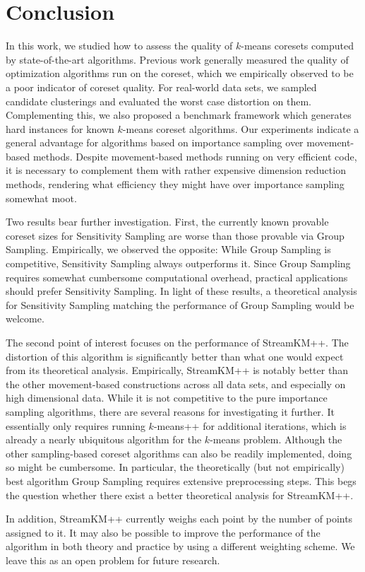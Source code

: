 \section{Conclusion} \label{sec:conclusion}
In this work, we studied how to assess the quality of $k$-means coresets computed by state-of-the-art algorithms. 
Previous work generally measured the quality of optimization algorithms run on the coreset, which we empirically observed to be a poor indicator of coreset quality.
For real-world data sets, we sampled candidate clusterings and evaluated the worst case distortion on them. Complementing this, we also proposed a benchmark framework which generates hard instances for known $k$-means coreset algorithms. Our experiments indicate a general advantage for algorithms based on importance sampling over movement-based methods. Despite movement-based methods running on very efficient code, it is necessary to complement them with rather expensive dimension reduction methods, rendering what efficiency they might have over importance sampling somewhat moot.

Two results bear further investigation. First, the currently known provable coreset sizes for Sensitivity Sampling are worse than those provable via Group Sampling. Empirically, we observed the opposite: While Group Sampling is competitive, Sensitivity Sampling always outperforms it. Since Group Sampling requires somewhat cumbersome computational overhead, practical applications should prefer Sensitivity Sampling. In light of these results, a theoretical analysis for Sensitivity Sampling matching the performance of Group Sampling would be welcome.

The second point of interest focuses on the performance of StreamKM++. The distortion of this algorithm is significantly better than what one would expect from its theoretical analysis.
Empirically, StreamKM++ is notably better than the other movement-based constructions across all data sets, and especially on high dimensional data.
While it is not competitive to the pure importance sampling algorithms, there are several reasons for investigating it further. It essentially only requires running $k$-means++ for additional iterations, which is already a nearly ubiquitous algorithm for the $k$-means problem. Although the other sampling-based coreset algorithms can also be readily implemented, doing so might be cumbersome. In particular, the theoretically (but not empirically) best algorithm Group Sampling requires extensive preprocessing steps.
This begs the question whether there exist a better theoretical analysis for StreamKM++.

In addition, StreamKM++ currently weighs each point by the number of points assigned to it. It may also be possible to improve the performance of the algorithm in both theory and practice by using a different weighting scheme. 
We leave this as an open problem for future research.
